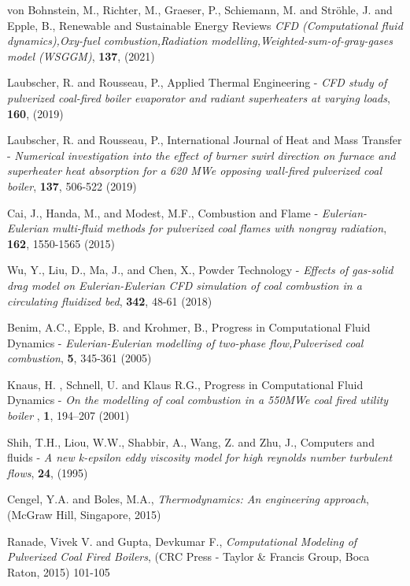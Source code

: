 \documentclass{webofc}
\begin{document}
\begin{thebibliography}{}
%
%

von Bohnstein, M., Richter, M., Graeser, P., Schiemann, M. and Str{\"{o}}hle, J. and Epple, B., Renewable and Sustainable Energy Reviews \textit{CFD (Computational fluid dynamics),Oxy-fuel combustion,Radiation modelling,Weighted-sum-of-gray-gases model (WSGGM)}, \textbf{137}, (2021)

Laubscher, R. and Rousseau, P., Applied Thermal Engineering - \textit{CFD study of pulverized coal-fired boiler evaporator and radiant superheaters at varying loads}, \textbf{160}, (2019)

Laubscher, R. and Rousseau, P., International Journal of Heat and Mass Transfer - \textit{Numerical investigation into the effect of burner swirl direction on furnace and superheater heat absorption for a 620 MWe opposing wall-fired pulverized coal boiler}, \textbf{137}, 506-522 (2019)

Cai, J., Handa, M., and Modest, M.F., Combustion and Flame - \textit{Eulerian-Eulerian multi-fluid methods for pulverized coal flames with nongray radiation}, \textbf{162}, 1550-1565 (2015)

Wu, Y., Liu, D., Ma, J., and Chen, X., Powder Technology - \textit{Effects of gas-solid drag model on Eulerian-Eulerian CFD simulation of coal combustion in a circulating fluidized bed}, \textbf{342}, 48-61 (2018)

Benim, A.C., Epple, B. and Krohmer, B., Progress in Computational Fluid Dynamics - \textit{Eulerian-Eulerian modelling of two-phase flow,Pulverised coal combustion}, \textbf{5}, 345-361 (2005)

Knaus, H. , Schnell, U. and  Klaus R.G., Progress in Computational Fluid Dynamics - \textit{On the modelling of coal combustion in a 550MWe coal fired utility boiler} , \textbf{1}, 194–207 (2001)

Shih, T.H., Liou, W.W., Shabbir, A., Wang, Z. and Zhu, J., Computers and fluids - \textit{A new k-epsilon eddy viscosity model for high reynolds number turbulent flows}, \textbf{24}, (1995)


Cengel, Y.A. and Boles, M.A., \textit{Thermodynamics: An engineering approach}, (McGraw Hill, Singapore, 2015)


Ranade, Vivek V. and Gupta, Devkumar F., \textit{Computational Modeling of Pulverized Coal Fired Boilers}, (CRC Press - Taylor {\&} Francis Group, Boca Raton, 2015) 101-105



\end{thebibliography}
\end{document}

